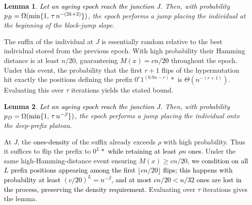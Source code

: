 \documentclass[lettersize,journal]{IEEEtran}
\newcommand{\new}[1]{\textcolor{black}{#1}}
\newcommand{\rerev}[1]{\textcolor{black}{#1}}
\newtheorem{lemma}{Lemma}
\begin{document}
\begin{lemma} \label{lem:BJO-epoch}
	\textcolor{black}{Let an ageing epoch reach the junction $J$.} Then, with probability $\new{p_B}=\Omega(\min\{1,\,\tau\,n^{-(2k+2)}\})$, the epoch performs a jump placing the individual at the beginning of the block-jump slope.
\end{lemma}

The suffix of the individual at $J$ is essentially random relative to the best individual stored from the 
previous epoch. 
With high probability their Hamming distance is at least $n/20$, guaranteeing 
\textcolor{black}{$M(x)= cn/20$} throughout the epoch.  
Under this event, the probability that the first $r+1$ flips of the hypermutation hit exactly the positions defining the prefix $0^{r}1^{(0.9n-r)} *$ is $\Theta(n^{-(r+1)})$.
Evaluating this over $\tau$ iterations yields the stated bound.





\begin{lemma} \label{lem:DPO-epoch}
	\textcolor{black}{Let an ageing epoch reach the junction $J$.} Then, with probability $\new{p_D}=\Omega(\min\{1,\,\tau\,n^{-\beta}\})$, the epoch performs a jump placing the individual onto the deep-prefix plateau.
\end{lemma}

At $J$, the \textcolor{black}{ones-density} of the suffix already exceeds $\rho$ with high probability.
Thus it suffices to flip the prefix to $0^L *$ \rerev{while retaining at least $\rho n$ ones}.
Under the same high-Hamming-distance event ensuring $M(x)\ge cn/20$, \rerev{we condition on all $L$ prefix positions appearing among the first $\lfloor cn/20\rfloor$ flips; this happens with probability at least $(c/20)^L = n^{-\beta}$, and at most $cn/20 < n/32$ ones are lost in the process, preserving the density requirement.}
Evaluating over $\tau$ iterations gives the lemma.
\end{document}
